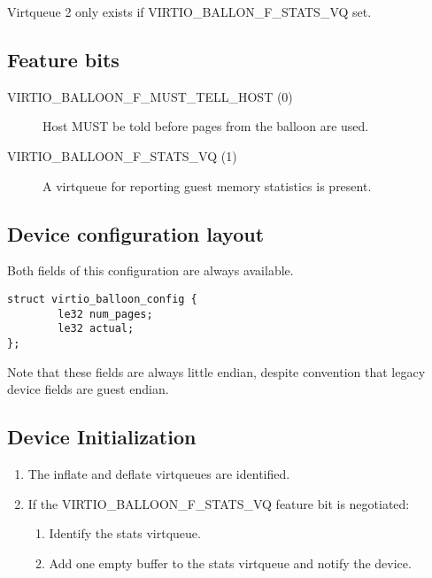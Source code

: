   Virtqueue 2 only exists if VIRTIO_BALLON_F_STATS_VQ set.

\subsection{Feature bits}\label{sec:Device Types / Memory Balloon Device / Feature bits}
\begin{description}
\item[VIRTIO_BALLOON_F_MUST_TELL_HOST (0)] Host MUST be told before
    pages from the balloon are used.

\item[VIRTIO_BALLOON_F_STATS_VQ (1)] A virtqueue for reporting guest
    memory statistics is present.
\end{description}

\subsection{Device configuration layout}\label{sec:Device Types / Memory Balloon Device / Device configuration layout}
  Both fields of this configuration
  are always available.

\begin{lstlisting}
struct virtio_balloon_config {
        le32 num_pages;
        le32 actual;
};
\end{lstlisting}

Note that these fields are always little endian, despite convention
that legacy device fields are guest endian.

\subsection{Device Initialization}\label{sec:Device Types / Memory Balloon Device / Device Initialization}

\begin{enumerate}
\item The inflate and deflate virtqueues are identified.

\item If the VIRTIO_BALLOON_F_STATS_VQ feature bit is negotiated:
  \begin{enumerate}
  \item Identify the stats virtqueue.

  \item Add one empty buffer to the stats virtqueue and notify the
    device.
  \end{enumerate}
\end{enumerate}

